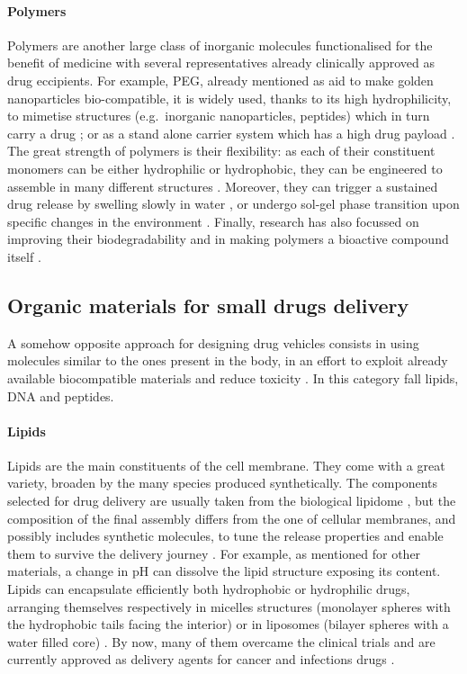 \paragraph{Polymers} Polymers are another large class of inorganic molecules functionalised for the benefit of medicine with several representatives already clinically approved as drug eccipients. For example, PEG, already mentioned as aid to make golden nanoparticles bio-compatible, it is widely used, thanks to its high hydrophilicity, to mimetise structures (e.g.\ inorganic nanoparticles, peptides) which in turn carry a drug \cite{Lammers2009}; or as a stand alone carrier system which has a high drug payload \cite{Liechty2010}. The great strength of polymers is their flexibility: as each of their constituent monomers can be either hydrophilic or hydrophobic, they can be engineered to assemble in many different structures \cite{Kawakatsu2004}. Moreover, they can trigger a sustained drug release by swelling slowly in water \cite{Nicolas2013}, or undergo sol-gel phase transition upon specific changes in the environment \cite{Liechty2010}. Finally, research has also focussed on improving their biodegradability \cite{Nair2007} and in making polymers a bioactive compound itself \cite{Rao2018}.


\subsection{Organic materials for small drugs delivery} \label{sec:organic}

A somehow opposite approach for designing drug vehicles consists in using molecules similar to the ones present in the body, in an effort to exploit already available biocompatible materials and reduce toxicity \cite{Yoo2011}. In this category fall lipids, DNA and peptides.

\paragraph{Lipids} Lipids are the main constituents of the cell membrane. They come with a great variety, broaden by the many species produced synthetically. The components selected for drug delivery are usually taken from the biological lipidome \cite{seeRebuttal}, but the composition of the final assembly differs from the one of cellular membranes, and possibly includes synthetic molecules, to tune the release properties and enable them to survive the delivery journey \cite{Yingchoncharoen2016}. For example, as mentioned for other materials, a change in pH can dissolve the lipid structure exposing its content.
%
Lipids can encapsulate efficiently both hydrophobic or hydrophilic drugs, arranging themselves respectively in micelles structures (monolayer spheres with the hydrophobic tails facing the interior) or in liposomes (bilayer spheres with a water filled core) \cite{Bunker2016}. By now, many of them overcame the clinical trials and are currently approved as delivery agents for cancer and infections drugs \cite{Pattni2015paper, Jain2017}.

